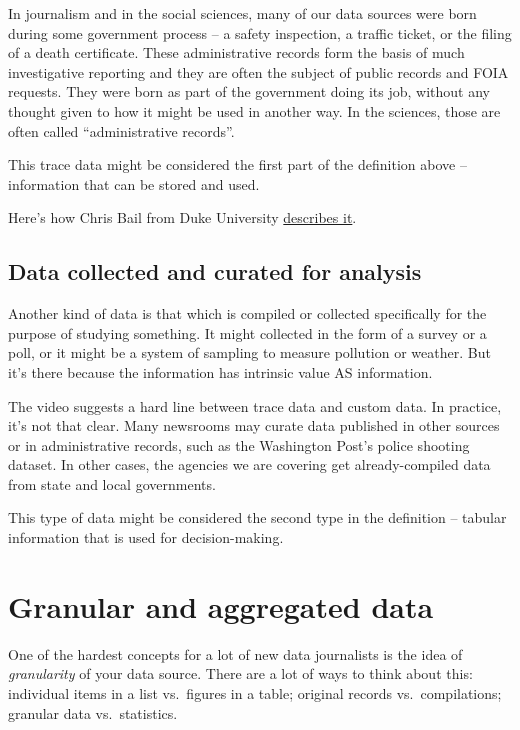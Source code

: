 \documentclass[
  letterpaper,
  DIV=11,
  numbers=noendperiod]{scrreprt}
\begin{document}
In journalism and in the social sciences, many of our data sources were
born during some government process -- a safety inspection, a traffic
ticket, or the filing of a death certificate. These administrative
records form the basis of much investigative reporting and they are
often the subject of public records and FOIA requests. They were born as
part of the government doing its job, without any thought given to how
it might be used in another way. In the sciences, those are often called
``administrative records''.

This trace data might be considered the first part of the definition
above -- information that can be stored and used.

Here's how Chris Bail from Duke University
\href{https://www.youtube.com/embed/uuSWQN7uYhk}{describes it}.

\hypertarget{data-collected-and-curated-for-analysis}{%
\subsection*{Data collected and curated for
analysis}\label{data-collected-and-curated-for-analysis}}

Another kind of data is that which is compiled or collected specifically
for the purpose of studying something. It might collected in the form of
a survey or a poll, or it might be a system of sampling to measure
pollution or weather. But it's there because the information has
intrinsic value AS information.

The video suggests a hard line between trace data and custom data. In
practice, it's not that clear. Many newsrooms may curate data published
in other sources or in administrative records, such as the Washington
Post's police shooting dataset. In other cases, the agencies we are
covering get already-compiled data from state and local governments.

This type of data might be considered the second type in the definition
-- tabular information that is used for decision-making.

\hypertarget{granular-and-aggregated-data}{%
\section{Granular and aggregated
data}\label{granular-and-aggregated-data}}

One of the hardest concepts for a lot of new data journalists is the
idea of \emph{granularity} of your data source. There are a lot of ways
to think about this: individual items in a list vs.~figures in a table;
original records vs.~compilations; granular data vs.~statistics.
\end{document}
